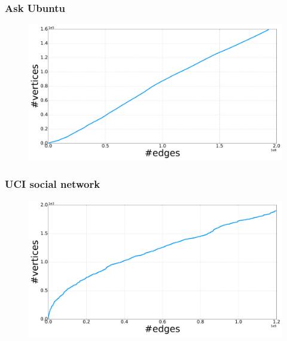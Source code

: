 \documentclass[final,hyperref={pdfpagelabels=false},noamsthm]{beamer}
\begin{document}
\begin{frame}
	\frametitle{Ask Ubuntu}
	\begin{figure}[h]
		\includegraphics[width=1.0\textwidth]{fig/n_askubuntu_arrival.pdf}
	\end{figure}
\end{frame}

\begin{frame}
	\frametitle{UCI social network}
	\begin{figure}[h]
		\includegraphics[width=1.0\textwidth]{fig/n_CollegeMsg_arrival.pdf}
	\end{figure}
\end{frame}

%	
%	
\end{document}
